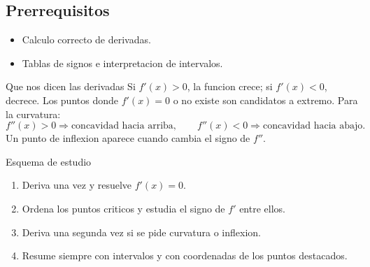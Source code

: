 \subsection*{Prerrequisitos}
\begin{itemize}
  \item Calculo correcto de derivadas.
  \item Tablas de signos e interpretacion de intervalos.
\end{itemize}

\begin{theorybox}{Que nos dicen las derivadas}
Si \(f'(x)>0\), la funcion crece; si \(f'(x)<0\), decrece. Los puntos donde \(f'(x)=0\) o no
existe son candidatos a extremo. Para la curvatura:
\[
f''(x)>0 \Longrightarrow \text{concavidad hacia arriba},\qquad
f''(x)<0 \Longrightarrow \text{concavidad hacia abajo}.
\]
Un punto de inflexion aparece cuando cambia el signo de \(f''\).
\end{theorybox}

\begin{methodbox}{Esquema de estudio}
\begin{enumerate}
  \item Deriva una vez y resuelve \(f'(x)=0\).
  \item Ordena los puntos criticos y estudia el signo de \(f'\) entre ellos.
  \item Deriva una segunda vez si se pide curvatura o inflexion.
  \item Resume siempre con intervalos y con coordenadas de los puntos destacados.
\end{enumerate}
\end{methodbox}

